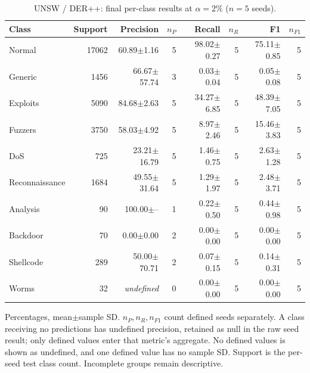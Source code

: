 \begin{table}[t]
\centering\scriptsize
\setlength{\tabcolsep}{3.3pt}
\caption{UNSW / DER++: final per-class results at $\alpha=2\%$ ($n=5$ seeds).}\label{tab:forgetting-class-unsw_nb15-derpp}
\begin{tabular}{lrrrrrrr}
\toprule
Class & Support & Precision & $n_P$ & Recall & $n_R$ & F1 & $n_{F1}$ \\
\midrule
Normal & 17062 & 60.89$\pm$1.16 & 5 & 98.02$\pm$0.27 & 5 & 75.11$\pm$0.85 & 5 \\
Generic & 1456 & 66.67$\pm$57.74 & 3 & 0.03$\pm$0.04 & 5 & 0.05$\pm$0.08 & 5 \\
Exploits & 5090 & 84.68$\pm$2.63 & 5 & 34.27$\pm$6.85 & 5 & 48.39$\pm$7.05 & 5 \\
Fuzzers & 3750 & 58.03$\pm$4.92 & 5 & 8.97$\pm$2.46 & 5 & 15.46$\pm$3.83 & 5 \\
DoS & 725 & 23.21$\pm$16.79 & 5 & 1.46$\pm$0.75 & 5 & 2.63$\pm$1.28 & 5 \\
Reconnaissance & 1684 & 49.55$\pm$31.64 & 5 & 1.29$\pm$1.97 & 5 & 2.48$\pm$3.71 & 5 \\
Analysis & 90 & 100.00$\pm$-- & 1 & 0.22$\pm$0.50 & 5 & 0.44$\pm$0.98 & 5 \\
Backdoor & 70 & 0.00$\pm$0.00 & 2 & 0.00$\pm$0.00 & 5 & 0.00$\pm$0.00 & 5 \\
Shellcode & 289 & 50.00$\pm$70.71 & 2 & 0.07$\pm$0.15 & 5 & 0.14$\pm$0.31 & 5 \\
Worms & 32 & \textit{undefined} & 0 & 0.00$\pm$0.00 & 5 & 0.00$\pm$0.00 & 5 \\
\bottomrule
\end{tabular}
\par\smallskip\begin{minipage}{0.98\textwidth}\scriptsize Percentages, mean$\pm$sample SD. $n_P,n_R,n_{F1}$ count defined seeds separately. A class receiving no predictions has undefined precision, retained as null in the raw seed result; only defined values enter that metric's aggregate. No defined values is shown as undefined, and one defined value has no sample SD. Support is the per-seed test class count. Incomplete groups remain descriptive.\end{minipage}
\end{table}


